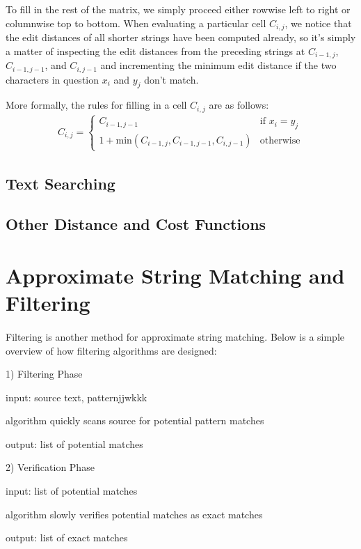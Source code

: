 \documentclass[10pt]{article}
\begin{document}
To fill in the rest of the matrix, we simply proceed either rowwise left to
right or columnwise top to bottom. When evaluating a particular cell $C_{i, j}$,
we notice that the edit distances of all shorter strings have been computed
already, so it's simply a matter of inspecting the edit distances from the
preceding strings at $C_{i - 1, j}$, $C_{i - 1, j - 1}$, and $C_{i, j - 1}$ and
incrementing the minimum edit distance if the two characters in question $x_{i}$
and $y_{j}$ don't match.

More formally, the rules for filling in a cell $C_{i, j}$ are as follows:
\begin{align*}
C_{i, j} = \begin{cases}
C_{i - 1, j - 1} & \text{if } x_{i} = y_{j} \\
1 + \text{min}(C_{i - 1, j}, C_{i - 1, j - 1}, C_{i, j - 1}) & \text{otherwise}
\end{cases}
\end{align*}

\subsection*{Text Searching}

\subsection*{Other Distance and Cost Functions}



\section*{Approximate String Matching and Filtering}

\paragraph{}Filtering is another method for approximate string matching. Below is a simple overview of how filtering algorithms are designed:

\begin{list}{}{}
\item 1) Filtering Phase
\begin{list}{*}{}
\item input: source text, patternjjwkkk
\item algorithm quickly scans source for potential pattern matches
\item output: list of potential matches
\end{list}
\item 2) Verification Phase
\begin{list}{*}{}
\item input: list of potential matches
\item algorithm slowly verifies potential matches as exact matches
\item output: list of exact matches
\end{list}
\end{list}
\end{document}

